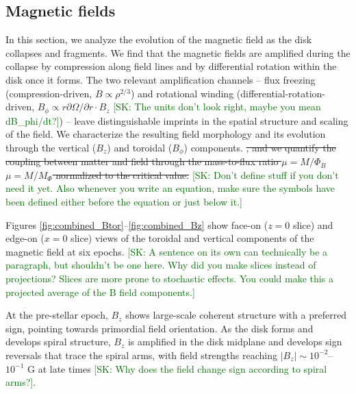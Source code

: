 \documentclass[twocolumn]{openjournal}
\newcommand{\skcomment}[1]{{\textcolor{darkgreen}{[SK: #1]}}}
\newcommand{\skcut}[1]{{\textcolor{scut}{\sout{#1}}}}
\newcommand{\skadd}[1]{{\textcolor{orange(ryb)}{#1}}}
\begin{document}
\subsection{Magnetic fields}
\label{sec:bfield}

\skadd{In this section, we analyze the evolution of the magnetic field as the disk collapses and fragments.}
\skadd{We find that the} magnetic fields are amplified during the collapse by compression along field lines and by differential rotation within the disk once it forms.
The two relevant amplification channels -- flux freezing (compression-driven, $B \propto \rho^{2/3}$) and rotational winding (differential-rotation-driven, $B_\phi \propto r \partial\Omega/\partial r \cdot B_z$ \skcomment{The units don't look right, maybe you mean dB\_phi/dt?}) -- leave distinguishable imprints in the spatial structure and scaling of the field.
We characterize the resulting field morphology and its evolution through the vertical ($B_z$) and toroidal ($B_\phi$) components. \skcut{, and we quantify the coupling between matter and field through the mass-to-flux ratio \skcut{$\mu = M/\Phi_B$} \skadd{$\mu = M/M_\Phi$} normalized to the critical value.} \skcomment{Don't define stuff if you don't need it yet. Also whenever you write an equation, make sure the symbols have been defined either before the equation or just below it.}


Figures \ref{fig:combined_Btor}--\ref{fig:combined_Bz}
show face-on ($z=0$ slice) and edge-on ($x=0$ slice) views of the
toroidal and vertical components of the magnetic field at six epochs. \skcomment{A sentence on its own can technically be a paragraph, but shouldn't be one here. Why did you make slices instead of projections? Slices are more prone to stochastic effects. You could make this a projected average of the B field components.}

At the pre-stellar epoch, $B_z$ shows large-scale coherent structure
with a preferred sign, pointing towards primordial field orientation.
As the disk forms and develops spiral structure, $B_z$ is amplified
in the disk midplane and develops sign reversals that trace the
spiral arms, with field strengths reaching
$|B_z| \sim 10^{-2}$--$10^{-1}$ G at late times \skcomment{Why does the field change sign according to spiral arms?}.
\end{document}
